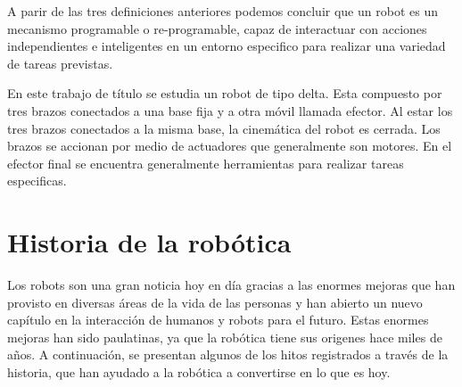     A parir de las tres definiciones anteriores podemos concluir que un robot es un mecanismo programable o re-programable, capaz de interactuar con acciones independientes e inteligentes en un entorno especifico para realizar una variedad de tareas previstas.
    
    En este trabajo de título se estudia un robot de tipo delta. Esta compuesto por tres brazos conectados a una base fija y a otra móvil llamada efector. Al estar los tres brazos conectados a la misma base, la cinemática del robot es cerrada. Los brazos se accionan por medio de actuadores que generalmente son motores. En el efector final se encuentra generalmente herramientas para realizar tareas especificas.
    
    \newpage
\section{Historia de la robótica}
    
    Los robots son una gran noticia hoy en día gracias a las enormes mejoras que han provisto en diversas áreas de la vida de las personas y han abierto un nuevo capítulo en la interacción de humanos y robots para el futuro. Estas enormes mejoras han sido paulatinas, ya que la robótica tiene sus origenes hace miles de años. A continuación, se presentan algunos de los hitos registrados a través de la historia, que han ayudado a la robótica a convertirse en lo que es hoy.
    
